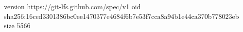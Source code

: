 version https://git-lfs.github.com/spec/v1
oid sha256:16ced3301386bc0ee1470377e4684f6b7e53f7cca8a94b1e44ca370b778023eb
size 5566
